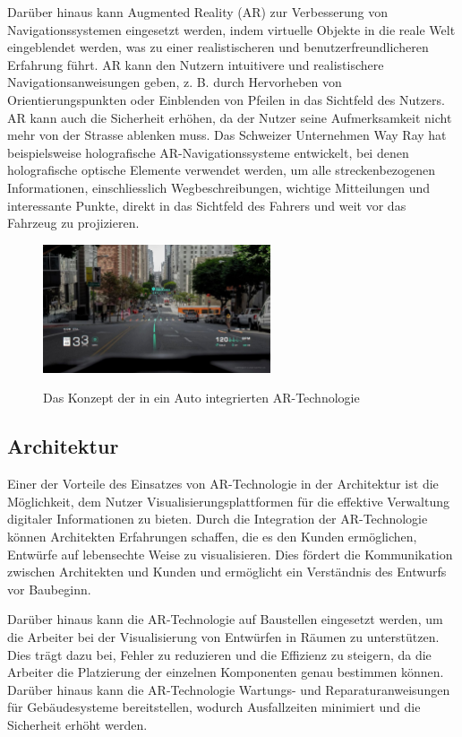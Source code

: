 Darüber hinaus kann Augmented Reality (AR) zur Verbesserung von Navigationssystemen eingesetzt werden, indem virtuelle Objekte in die reale Welt eingeblendet werden, was zu einer realistischeren und benutzerfreundlicheren Erfahrung führt. AR kann den Nutzern intuitivere und realistischere Navigationsanweisungen geben, z. B. durch Hervorheben von Orientierungspunkten oder Einblenden von Pfeilen in das Sichtfeld des Nutzers. AR kann auch die Sicherheit erhöhen, da der Nutzer seine Aufmerksamkeit nicht mehr von der Strasse ablenken muss. Das Schweizer Unternehmen Way Ray hat beispielsweise holografische AR-Navigationssysteme entwickelt, bei denen holografische optische Elemente verwendet werden, um alle streckenbezogenen Informationen, einschliesslich Wegbeschreibungen, wichtige Mitteilungen und interessante Punkte, direkt in das Sichtfeld des Fahrers und weit vor das Fahrzeug zu projizieren. \cite{WayRay}


\begin{figure}[ht!]
    \centering
    \includegraphics[width=0.6\textwidth]{attachments/wayray.jpg}
    \caption{Das Konzept der in ein Auto integrierten AR-Technologie} \cite{WayRay}
\end{figure}

\subsection{Architektur}
Einer der Vorteile des Einsatzes von AR-Technologie in der Architektur ist die Möglichkeit, dem Nutzer Visualisierungsplattformen für die effektive Verwaltung digitaler Informationen zu bieten. Durch die Integration der AR-Technologie können Architekten Erfahrungen schaffen, die es den Kunden ermöglichen, Entwürfe auf lebensechte Weise zu visualisieren. Dies fördert die Kommunikation zwischen Architekten und Kunden und ermöglicht ein Verständnis des Entwurfs vor Baubeginn. \cite{Chi2013ResearchTA}

Darüber hinaus kann die AR-Technologie auf Baustellen eingesetzt werden, um die Arbeiter bei der Visualisierung von Entwürfen in Räumen zu unterstützen. Dies trägt dazu bei, Fehler zu reduzieren und die Effizienz zu steigern, da die Arbeiter die Platzierung der einzelnen Komponenten genau bestimmen können. Darüber hinaus kann die AR-Technologie Wartungs- und Reparaturanweisungen für Gebäudesysteme bereitstellen, wodurch Ausfallzeiten minimiert und die Sicherheit erhöht werden. \cite{Chi2013ResearchTA}


